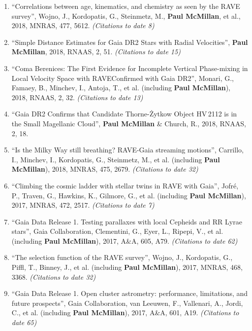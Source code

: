 \documentclass{resume}
\begin{document}
\begin{enumerate}
\item ``Correlations between age, kinematics, and chemistry as seen by the RAVE survey'', Wojno, J., Kordopatis, G., Steinmetz, M., \textbf{Paul McMillan}, et al., 2018, MNRAS, 477, 5612. \textit{(Citations to date 8)}

\item ``Simple Distance Estimates for Gaia DR2 Stars with Radial Velocities'', \textbf{Paul McMillan}, 2018, RNAAS, 2, 51. \textit{(Citations to date 15)}

\item ``Coma Berenices: The First Evidence for Incomplete Vertical Phase-mixing in Local Velocity Space with RAVE{\textemdash}Confirmed with Gaia DR2'', Monari, G., Famaey, B., Minchev, I., Antoja, T., et al. (including \textbf{Paul McMillan}), 2018, RNAAS, 2, 32. \textit{(Citations to date 13)}

\item ``Gaia DR2 Confirms that Candidate Thorne-\.Zytkow Object HV\,2112 is in the Small Magellanic Cloud'', \textbf{Paul McMillan} \& Church, R., 2018, RNAAS, 2, 18.

\item ``Is the Milky Way still breathing? RAVE-Gaia streaming motions'', Carrillo, I., Minchev, I., Kordopatis, G., Steinmetz, M., et al. (including \textbf{Paul McMillan}), 2018, MNRAS, 475, 2679. \textit{(Citations to date 32)}

\item ``Climbing the cosmic ladder with stellar twins in RAVE with Gaia'', Jofr\'e, P., Traven, G., Hawkins, K., Gilmore, G., et al. (including \textbf{Paul McMillan}), 2017, MNRAS, 472, 2517. \textit{(Citations to date 7)}

\item ``Gaia Data Release 1. Testing parallaxes with local Cepheids and RR Lyrae stars'', Gaia Collaboration, Clementini, G., Eyer, L., Ripepi, V., et al. (including \textbf{Paul McMillan}), 2017, A\&A, 605, A79. \textit{(Citations to date 62)}

\item ``The selection function of the RAVE survey'', Wojno, J., Kordopatis, G., Piffl, T., Binney, J., et al. (including \textbf{Paul McMillan}), 2017, MNRAS, 468, 3368. \textit{(Citations to date 32)}

\item ``Gaia Data Release 1. Open cluster astrometry: performance, limitations, and future prospects'', Gaia Collaboration, van Leeuwen, F., Vallenari, A., Jordi, C., et al. (including \textbf{Paul McMillan}), 2017, A\&A, 601, A19. \textit{(Citations to date 65)}


\end{enumerate}
\end{document}
